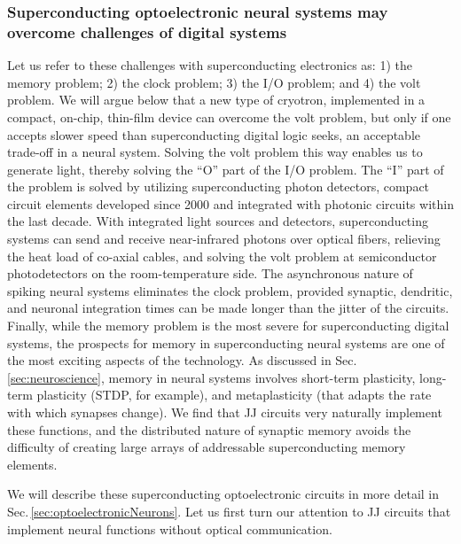  

\subsubsection{Superconducting optoelectronic neural systems may overcome challenges of digital systems}
Let us refer to these challenges with superconducting electronics as: 1) the memory problem; 2) the clock problem; 3) the I/O problem; and 4) the volt problem. We will argue below that a new type of cryotron, implemented in a compact, on-chip, thin-film device can overcome the volt problem, but only if one accepts slower speed than superconducting digital logic seeks, an acceptable trade-off in a neural system. Solving the volt problem this way enables us to generate light, thereby solving the ``O'' part of the I/O problem. The ``I'' part of the problem is solved by utilizing superconducting photon detectors, compact circuit elements developed since 2000 and integrated with photonic circuits within the last decade. With integrated light sources and detectors, superconducting systems can send and receive near-infrared photons over optical fibers, relieving the heat load of co-axial cables, and solving the volt problem at semiconductor photodetectors on the room-temperature side. The asynchronous nature of spiking neural systems eliminates the clock problem, provided synaptic, dendritic, and neuronal integration times can be made longer than the jitter of the circuits. Finally, while the memory problem is the most severe for superconducting digital systems, the prospects for memory in superconducting neural systems are one of the most exciting aspects of the technology. As discussed in Sec.\,\ref{sec:neuroscience}, memory in neural systems involves short-term plasticity, long-term plasticity (STDP, for example), and metaplasticity (that adapts the rate with which synapses change). We find that JJ circuits very naturally implement these functions, and the distributed nature of synaptic memory avoids the difficulty of creating large arrays of addressable superconducting memory elements. 

We will describe these superconducting optoelectronic circuits in more detail in Sec.\,\ref{sec:optoelectronicNeurons}. Let us first turn our attention to JJ circuits that implement neural functions without optical communication.